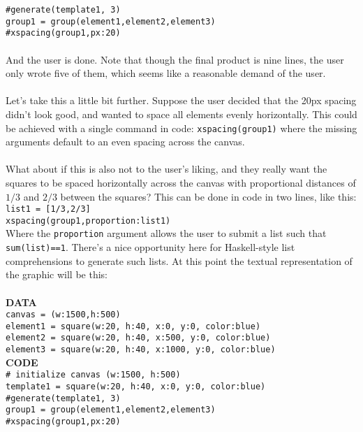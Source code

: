 \documentclass[12pt]{article}
\theoremstyle{remark}
\newcommand{\ttt}[1]{\texttt{#1}}
\begin{document}
\begin{section}
\ttt{\#generate(template1, 3)}\\
\ttt{group1 = group(element1,element2,element3)}\\
\ttt{\#xspacing(group1,px:20)}
\\\\
And the user is done. Note that though the final product is nine lines, the user only wrote five of them, which seems like a reasonable demand of the user.
\\\\
Let's take this a little bit further. Suppose the user decided that the 20px spacing didn't look good, and wanted to space all elements evenly horizontally. This could be achieved with a single command in code: \ttt{xspacing(group1)} where the missing arguments default to an even spacing across the canvas.
\\\\
What about if this is also not to the user's liking, and they really want the squares to be spaced horizontally across the canvas with proportional distances of $1/3$ and $2/3$ between the squares? This can be done in code in two lines, like this:
\\
\ttt{list1 = [1/3,2/3]}\\
\ttt{xspacing(group1,proportion:list1)}
\\
Where the \ttt{proportion} argument allows the user to submit a list such that \ttt{sum(list)==1}. There's a nice opportunity here for Haskell-style list comprehensions to generate such lists. At this point the textual representation of the graphic will be this:
\\\\
\textbf{DATA}\\
\ttt{canvas = (w:1500,h:500)}
\\
\ttt{element1 = square(w:20, h:40, x:0, y:0, color:blue)}
\\
\ttt{element2 = square(w:20, h:40, x:500, y:0, color:blue)}\\
\ttt{element3 = square(w:20, h:40, x:1000, y:0, color:blue)}\\
\textbf{CODE}\\
\ttt{\# initialize canvas (w:1500, h:500)}\\
\ttt{template1 = square(w:20, h:40, x:0, y:0, color:blue)}\\
\ttt{\#generate(template1, 3)}\\
\ttt{group1 = group(element1,element2,element3)}\\
\ttt{\#xspacing(group1,px:20)}\\

\end{section}
\end{document}
